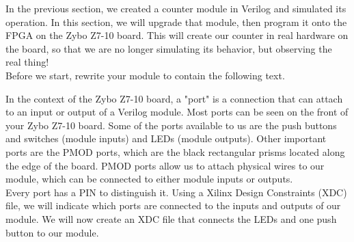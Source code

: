 \documentclass[11pt,twoside,titlepage]{article}
\begin{document}
	\noindent
	In the previous section, we created a counter module in Verilog and simulated its operation. In this section, we will upgrade that module, then program it onto the FPGA on the Zybo Z7-10 board. This will create our counter in real hardware on the board, so that we are no longer simulating its behavior, but observing the real thing! \\
	
	
	\noindent
	Before we start, rewrite your module to contain the following text.
	
	\begin{minipage}{\linewidth}
		
	\end{minipage}  
	
		\noindent
		In the context of the Zybo Z7-10 board, a "port" is a connection that can attach to an input or output of a Verilog module. Most ports can be seen on the front of your Zybo Z7-10 board. Some of the ports available to us are the push buttons and switches (module inputs) and LEDs (module outputs). Other important ports are the PMOD ports, which are the black rectangular prisms located along the edge of the board. PMOD ports allow us to attach physical wires to our module, which can be connected to either module inputs or outputs.\\
		
		\noindent
		Every port has a PIN to distinguish it. Using a Xilinx Design Constraints (XDC) file, we will indicate which ports are connected to the inputs and outputs of our module. We will now create an XDC file that connects the LEDs and one push button to our module.
		
\end{document}
